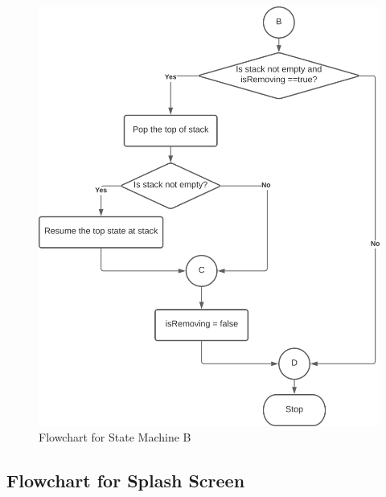 \documentclass[main]{subfiles}
\begin{document}
        \begin{figure}[H]
            \centering
            \includegraphics[scale=0.5]{graphics/flowcharts/state_machine2.png}
            \caption{Flowchart for State Machine B}
            \label{fig:state_machineB}
        \end{figure}
        


	\subsection{Flowchart for Splash Screen}
\end{document}
